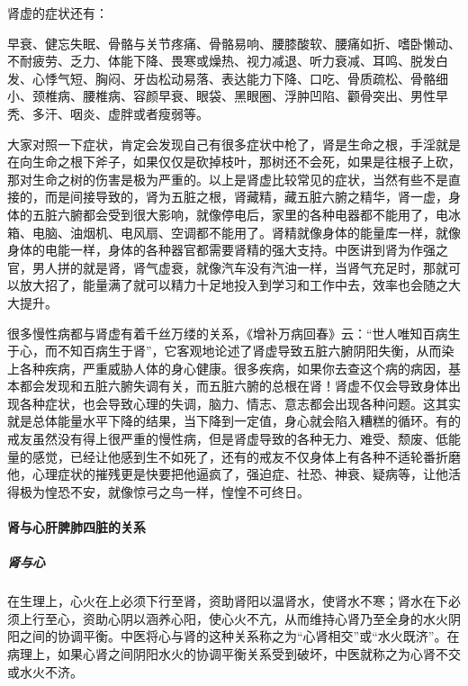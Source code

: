肾虚的症状还有：

早衰、健忘失眠、骨骼与关节疼痛、骨骼易响、腰膝酸软、腰痛如折、嗜卧懒动、不耐疲劳、乏力、体能下降、畏寒或燥热、视力减退、听力衰减、耳鸣、脱发白发、心悸气短、胸闷、牙齿松动易落、表达能力下降、口吃、骨质疏松、骨骼细小、颈椎病、腰椎病、容颜早衰、眼袋、黑眼圈、浮肿凹陷、颧骨突出、男性早秃、多汗、咽炎、虚胖或者瘦弱等。

大家对照一下症状，肯定会发现自己有很多症状中枪了，肾是生命之根，手淫就是在向生命之根下斧子，如果仅仅是砍掉枝叶，那树还不会死，如果是往根子上砍，那对生命之树的伤害是极为严重的。以上是肾虚比较常见的症状，当然有些不是直接的，而是间接导致的，肾为五脏之根，肾藏精，藏五脏六腑之精华，肾一虚，身体的五脏六腑都会受到很大影响，就像停电后，家里的各种电器都不能用了，电冰箱、电脑、油烟机、电风扇、空调都不能用了。肾精就像身体的能量库一样，就像身体的电能一样，身体的各种器官都需要肾精的强大支持。中医讲到肾为作强之官，男人拼的就是肾，肾气虚衰，就像汽车没有汽油一样，当肾气充足时，那就可以放大招了，能量满了就可以精力十足地投入到学习和工作中去，效率也会随之大大提升。

很多慢性病都与肾虚有着千丝万缕的关系，《增补万病回春》云：“世人唯知百病生于心，而不知百病生于肾”，它客观地论述了肾虚导致五脏六腑阴阳失衡，从而染上各种疾病，严重威胁人体的身心健康。很多疾病，如果你去查这个病的病因，基本都会发现和五脏六腑失调有关，而五脏六腑的总根在肾！肾虚不仅会导致身体出现各种症状，也会导致心理的失调，脑力、情志、意志都会出现各种问题。这其实就是总体能量水平下降的结果，当下降到一定值，身心就会陷入糟糕的循环。有的戒友虽然没有得上很严重的慢性病，但是肾虚导致的各种无力、难受、颓废、低能量的感觉，已经让他感到生不如死了，还有的戒友不仅身体上有各种不适轮番折磨他，心理症状的摧残更是快要把他逼疯了，强迫症、社恐、神衰、疑病等，让他活得极为惶恐不安，就像惊弓之鸟一样，惶惶不可终日。

\paragraph{肾与心肝脾肺四脏的关系}

\subparagraph{肾与心}

在生理上，心火在上必须下行至肾，资助肾阳以温肾水，使肾水不寒；肾水在下必须上行至心，资助心阴以涵养心阳，使心火不亢，从而维持心肾乃至全身的水火阴阳之间的协调平衡。中医将心与肾的这种关系称之为“心肾相交”或“水火既济”。在病理上，如果心肾之间阴阳水火的协调平衡关系受到破坏，中医就称之为心肾不交或水火不济。


